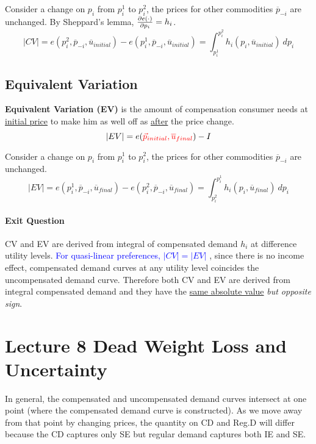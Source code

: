 \documentclass[]{article}
\begin{document}
            \begin{remark}
                Consider a change on $p_i$ from $p_i^1$ to $p_i^2$, the prices for other commodities $\overline{p}_{-i}$ are unchanged. By Sheppard's lemma, $\frac{\partial{e(\cdot)}}{\partial{p_i}} = h_i$.
                \[
                    |CV| = e(p_i^2, \overline{p}_{-i}, \overline{u}_{initial}) - e(p_i^1, \overline{p}_{-i}, \overline{u}_{initial}) = \int_{p_i^1}^{p_i^2}{h_i(p_i, \overline{u}_{initial})\ dp_i}
                \]
            \end{remark}
        
        \subsection{Equivalent Variation}
            \begin{definition}
                \textbf{Equivalent Variation (EV)} is the amount of compensation consumer needs at \ul{initial price} to make him as well off as \ul{after} the price change.
                \[
                    |EV| = e(
                    \textcolor{red}{
                        \vec{p}_{initial}, \overline{u}_{final}
                        }) - I 
                \]
            \end{definition}
        
        \begin{remark}
            Consider a change on $p_i$ from $p_i^1$ to $p_i^2$, the prices for other commodities $\overline{p}_{-i}$ are unchanged.
            \[
                |EV| = e(p_i^1, \overline{p}_{-i}, \overline{u}_{final}) - e(p_i^2, \overline{p}_{-i}, \overline{u}_{final}) = \int_{p_i^2}^{p_i^1}{h_i(p_i, \overline{u}_{final})\ dp_i}
            \]
        \end{remark}
        
        \paragraph{Exit Question}
            CV and EV are derived from integral of compensated demand $h_i$ at difference utility levels.
            \textcolor{blue}{For quasi-linear preferences, $|CV| = |EV|$}
            , since there is no income effect, compensated demand curves at any utility level coincides the uncompensated demand curve. Therefore both CV and EV are derived from integral compensated demand and they have the \ul{same absolute value} \emph{but opposite sign}.
    
    \section{Lecture 8 Dead Weight Loss and Uncertainty}
        \begin{remark}
            In general, the compensated and uncompensated demand curves intersect at one point (where the compensated demand curve is constructed). As we move away from that point by changing prices, the quantity on CD and Reg.D will differ because the CD captures only SE but regular demand captures both IE and SE.
        \end{remark}
        
\end{document}
